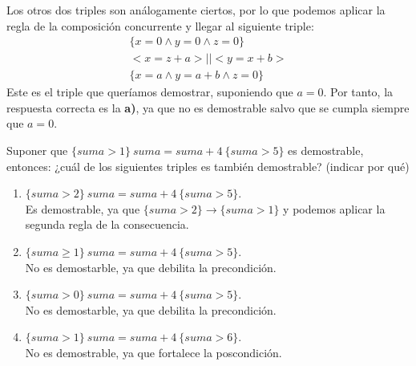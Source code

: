 \begin{ejercicio}
    Los otros dos triples son análogamente ciertos, por lo que podemos aplicar la regla de la composición concurrente y llegar al siguiente triple:
    \begin{gather*}
        \{x=0 \land y = 0 \land z = 0\} \\
        <x = z + a> || <y = x+b> \\
        \{x = a \land  y = a +b \land z = 0\}
    \end{gather*}
    Este es el triple que queríamos demostrar, suponiendo que \ul{$a=0$}. Por tanto, la respuesta correcta es la \textbf{a)}, ya que no es demostrable salvo que se cumpla siempre que $a=0$.
\end{ejercicio}

\begin{ejercicio}
    Suponer que $\{suma>1\}\ suma=suma+4\ \{suma>5\}$ es demostrable, entonces: ¿cuál de los siguientes triples es también demostrable? (indicar por qué)
    \begin{enumerate}
        \item $\{suma>2\}\ suma=suma+4\ \{suma>5\}$.\\
            Es demostrable, ya que $\{suma>2\}\rightarrow\{suma>1\}$ y podemos aplicar la segunda regla de la consecuencia.
        \item $\{suma\geq 1\}\ suma=suma+4\ \{suma > 5\}$.\\
            No es demostarble, ya que debilita la precondición.
        \item $\{suma>0\}\ suma=suma+4\ \{suma > 5\}$.\\
            No es demostarble, ya que debilita la precondición.
        \item $\{suma>1\}\ suma=suma+4\ \{suma > 6\}$.\\
            No es demostrable, ya que fortalece la poscondición.
    \end{enumerate}
\end{ejercicio}

